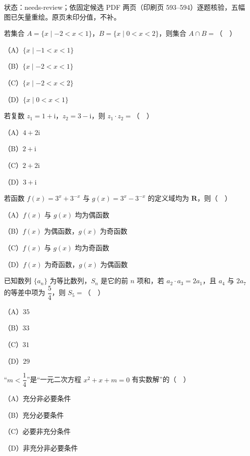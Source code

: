 

状态：needs-review；依固定候选 PDF 两页（印刷页 593–594）逐题核验，五幅图已矢量重绘。原页未印分值，不补。


\begin{question}
若集合 $A=\{x\mid -2<x<1\}$，$B=\{x\mid 0<x<2\}$，则集合 $A\cap B=$（　）

（A）$\{x\mid -1<x<1\}$

（B）$\{x\mid -2<x<1\}$

（C）$\{x\mid -2<x<2\}$

（D）$\{x\mid 0<x<1\}$

\end{question}
\begin{question}
若复数 $z_1=1+\mathrm i$，$z_2=3-\mathrm i$，则 $z_1\cdot z_2=$（　）

（A）$4+2\mathrm i$

（B）$2+\mathrm i$

（C）$2+2\mathrm i$

（D）$3+\mathrm i$

\end{question}
\begin{question}
若函数 $f(x)=3^x+3^{-x}$ 与 $g(x)=3^x-3^{-x}$ 的定义域均为 $\mathbf R$，则（　）

（A）$f(x)$ 与 $g(x)$ 均为偶函数

（B）$f(x)$ 为偶函数，$g(x)$ 为奇函数

（C）$f(x)$ 与 $g(x)$ 均为奇函数

（D）$f(x)$ 为奇函数，$g(x)$ 为偶函数

\end{question}
\begin{question}
已知数列 $\{a_n\}$ 为等比数列，$S_n$ 是它的前 $n$ 项和，若 $a_2\cdot a_3=2a_1$，且 $a_4$ 与 $2a_7$ 的等差中项为 $\dfrac54$，则 $S_5=$（　）

（A）$35$

（B）$33$

（C）$31$

（D）$29$

\end{question}
\begin{question}
“$m<\dfrac14$”是“一元二次方程 $x^2+x+m=0$ 有实数解”的（　）

（A）充分非必要条件

（B）充分必要条件

（C）必要非充分条件

（D）非充分非必要条件

\Needspace{0.4\textheight}
\end{question}
